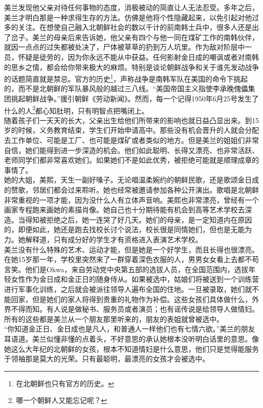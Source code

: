 美兰发现他父亲对待任何事物的态度，消极被动的简直让人无法忍受。多年之后，美兰才明白那是一种求得生存的方法。仿佛是他将个性隐藏起来，以免引起对他过多的关注。在想使自己融入北朝鲜社会的数以千计的前南韩士兵中，很多人还是出了岔子。美兰的母亲后来告诉她，他父亲有四个与他一同在煤矿工作的南韩伙伴，就因一点点的过失都被处决了，尸体被草草的扔到万人坑里。作为敌对阶层中一员，怀疑是徒劳的，因为你永远不能从中获益。任何影射金日成的嘲讽或者对南韩的思乡之情，都会给你带来极大的麻烦。特别是谈论朝鲜战争和关于谁先发动战争的话题简直就是禁忌。官方的历史\footnote{在北朝鲜也只有官方的历史。}，声称战争是南韩军队在美国的命令下挑起的，而不是北朝鲜的军队暴风般的越过三八线。“美国帝国主义指使李承晚傀儡集团挑起朝鲜战争。”援引朝鲜《劳动新闻》。然而，每一个记得1950年6月25号发生了什么的人\footnote{哪一个朝鲜人又能忘记呢？}都心知肚明，只有明智点把嘴闭上。\\

随着孩子们一天天的长大，父亲出生给他们所带来的影响也就日益凸显出来。到15岁的时候，义务教育结束，学生们开始申请高中。那些没有机会晋升的人就会分配去工作单位、可能是工厂、也可能是煤矿或者类似的地方。但是美兰的姐姐们非常自信，她们能得到进一步深造的机会。他们如此聪明、长得又漂亮、也非常活跃、老师同学们都非常喜欢她们。如果她们不是如此优秀，被拒绝可能就是顺理成章的事情了。\\

她的大姐，美熙，天生一副好嗓子。无论唱温柔婉约的朝鲜民歌，还是歌颂金日成的赞歌，邻居们都会过来聆听。她也经常被邀请参加各种公开演出。歌唱是北朝鲜非常重视的一项才能，因为没什么人有立体声音响。美熙也非常漂亮，曾经有一个画家专程跑来画她的素描肖像。她自己也十分期待能有机会到高等艺术学校去深造。当得知被拒绝之后，她一连哭了好几天。她们的母亲，是一定知道内在原因的，即便如此，她还是跑去找校长讨个说法，校长很是同情她们，但也是无能为力。她解释道，只有成分好的学生才有资格进入表演艺术学校。\\

美兰没有什么特殊的艺术、运动才能，但是她是一个好学生，而且长得也很漂亮。在她15岁那一年，学校里突然来了一群穿着深色衣服的人，男男女女看上去都不苟言笑。他们是Okwa，来自劳动党中央第五部的选拔人员，在全国范围内，选拔年轻女性作为金日成和金正日的随身侍从。如果被选中，姑娘们将被送到一个训练营进行军事化训练，之后就会被派往领导人遍布全国的住地。一旦被录取，她们就不能回家，但是她们的家人将得到贵重的礼物作为补偿。这些女孩们具体做什么，外界不得而知。有人说是做秘书、服务员或者演员；也有谣传说是给领导人做情妇。所有的这些都是美兰从一个朋友那里听来的，朋友的表姐就曾被选中。\\

“你知道金正日、金日成也是凡人，和普通人一样他们也有七情六欲。”美兰的朋友耳语道。美兰似懂非懂的点着头，不好意思的承认她根本没听明白话里的意思。像她这么大年纪的北朝鲜的女孩，根本不知道情妇是什么意思，他们只是觉得能服务于领袖那是莫大的光荣。只有最聪明，最漂亮的女孩才会被选中。\\

